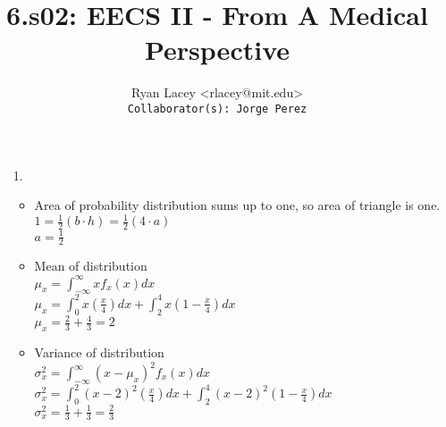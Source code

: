 \documentclass{article}
\begin{document}

\title{6.s02: EECS II - From A Medical Perspective}
\author{
  Ryan Lacey <rlacey@mit.edu>\\
  \footnotesize \texttt{Collaborator(s): Jorge Perez}
}
        
\maketitle
        


\begin{enumerate}

\item[1.]
	\begin{itemize}
	\item
		Area of probability distribution sums up to one, so area of triangle is one.\\
		
		$1 = \frac{1}{2} \left(b \cdot h \right)= \frac{1}{2} \left( 4 \cdot a \right)$\\
		
		$a = \frac{1}{2}$\\

	\item Mean of distribution\\

		$\mu_x = \displaystyle\int_{-\infty}^{\infty} xf_x(x)dx$\\
		
		$\mu_x = \displaystyle\int_{0}^{2} x \left(\frac{x}{4}\right)dx + \displaystyle\int_{2}^{4} x \left(1- \frac{x}{4}\right)dx$\\

		$\mu_x = \frac{2}{3} + \frac{4}{3} = 2$\\

	\item Variance of distribution\\

		$\sigma^2_x = \displaystyle\int_{-\infty}^{\infty} \left(x - \mu_x\right)^2f_x(x)dx$\\
		
		$\sigma^2_x = \displaystyle\int_{0}^{2} \left(x - 2\right)^2 \left(\frac{x}{4}\right)dx + \displaystyle\int_{2}^{4} \left(x - 2\right)^2 \left(1- \frac{x}{4}\right)dx$\\
		
		$\sigma^2_x = \frac{1}{3} + \frac{1}{3} = \frac{2}{3}$\\
	\end{itemize}


\end{enumerate}
\end{document}
